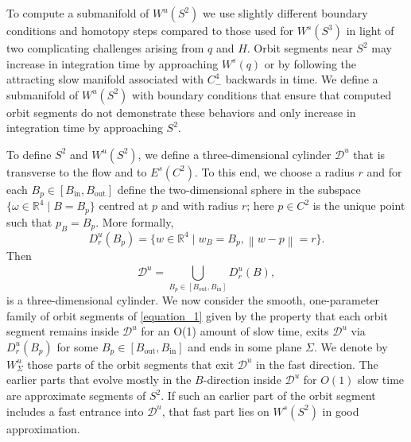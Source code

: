 \documentclass{ws-ijbc}
\begin{document}
To compute a submanifold of $W^{u}(S^2)$ we use slightly different boundary conditions and homotopy steps compared to those used for $W^s(S^3)$ in light of two complicating challenges arising from $q$ and $H$.  Orbit segments near $S^2$ may increase in integration time by approaching $W^s(q)$ or by following the attracting slow manifold associated with $C^4_-$ backwards in time.  We define a submanifold of $W^u(S^2)$ with boundary conditions that ensure that computed orbit segments do not demonstrate these behaviors and only increase in integration time by approaching $S^2$.  

To define $S^2$ and $W^u(S^2)$, we define a three-dimensional cylinder $\mathscr{D}^u$ that is transverse to the flow and to $E^s(C^2)$.  To this end, we choose a radius $r$ and for each $B_p \in [B_{\mathrm{in}}, B_{\mathrm{out}}]$ define the two-dimensional sphere in the subspace $\{\omega \in \mathbb{R}^4 \; | \; B=B_p\}$ centred at $p$ and with radius $r$; here $p \in C^2$ is the unique point such that $p_B = B_p$.  More formally,
%
\begin{equation*}
D^u_r(B_p)=\{w \in \mathbb{R}^4 \;|\; w_B = B_p, \left\lVert w-p \right\lVert  = r\}.
\end{equation*}
%
Then 
%
\begin{equation*}
\mathscr{D}^u = \bigcup\limits_{B_p \in [B_{\mathrm{out}}, B_{\mathrm{in}}]}^{}D^u_r(B),
\end{equation*}
%
is a three-dimensional cylinder.  We now consider the smooth, one-parameter family of orbit segments of \eqref{equation_1} given by the property that each orbit segment remains inside $\mathscr{D}^u$ for an O(1) amount of slow time, exits $\mathscr{D}^u$ via $D^u_r(B_p)$ for some $B_p \in [B_{\text{out}}, B_{\text{in}}]$ and ends in some plane $\Sigma$.  We denote by $W^u_\Sigma$ those parts of the orbit segments that exit $\mathscr{D}^u$ in the fast direction.  The earlier parts that evolve mostly in the $B$-direction inside $\mathscr{D}^u$ for $O(1)$ slow time are approximate segments of $S^2$.  If such an earlier part of the orbit segment includes a fast entrance into $\mathscr{D}^u$, that fast part lies on $W^s(S^2)$ in good approximation.
\end{document}
